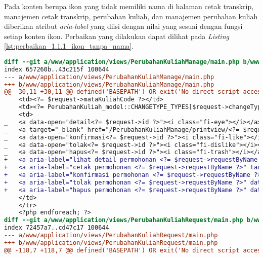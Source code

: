 Pada konten berupa ikon yang tidak memiliki nama di halaman cetak transkrip, manajemen cetak transkrip, perubahan kuliah, dan manajemen perubahan kuliah diberikan atribut \textit{aria-label} yang diisi dengan nilai yang sesuai dengan fungsi setiap konten ikon. Perbaikan yang dilakukan dapat dilihat pada \textit{Listing} \ref{lst:perbaikan_1.1.1_ikon_tanpa_nama}.
\begin{lstlisting}[frame=single, label={lst:perbaikan_1.1.1_ikon_tanpa_nama}, language=diff, caption=Perbaikan Kriteria Sukses 1.1.1]
diff --git a/www/application/views/PerubahanKuliahManage/main.php b/www/application/views/PerubahanKuliahManage/main.php
index 657260b..43c215f 100644
--- a/www/application/views/PerubahanKuliahManage/main.php
+++ b/www/application/views/PerubahanKuliahManage/main.php
@@ -30,11 +30,11 @@ defined('BASEPATH') OR exit('No direct script access allowed');
    <td><?= $request->mataKuliahCode ?></td>
    <td><?= PerubahanKuliah_model::CHANGETYPE_TYPES[$request->changeType] ?></td>
    <td>
_   <a data-open="detail<?= $request->id ?>"><i class="fi-eye"></i></a>
_   <a target="_blank" href="/PerubahanKuliahManage/printview/<?= $request->id ?>"><i class="fi-print"></i></a>
_   <a data-open="konfirmasi<?= $request->id ?>"><i class="fi-like"></i></a>                                    
_   <a data-open="tolak<?= $request->id ?>"><i class="fi-dislike"></i></a>
_   <a data-open="hapus<?= $request->id ?>"><i class="fi-trash"></i></a>
+   <a aria-label="lihat detail permohonan <?= $request->requestByName ?>" data-open="detail<?= $request->id ?>"><i class="fi-eye"></i></a>
+   <a aria-label="cetak permohonan <?= $request->requestByName ?>" target="_blank" href="/PerubahanKuliahManage/printview/<?= $request->id ?>"><i class="fi-print"></i></a>
+   <a aria-label="konfirmasi permohonan <?= $request->requestByName ?>" data-open="konfirmasi<?= $request->id ?>"><i class="fi-like"></i></a>
+   <a aria-label="tolak permohonan <?= $request->requestByName ?>" data-open="tolak<?= $request->id ?>"><i class="fi-dislike"></i></a>
+   <a aria-label="hapus permohonan <?= $request->requestByName ?>" data-open="hapus<?= $request->id ?>"><i class="fi-trash"></i></a>
    </td>
    </tr>
    <?php endforeach; ?>
diff --git a/www/application/views/PerubahanKuliahRequest/main.php b/www/application/views/PerubahanKuliahRequest/main.php
index 72457a7..cd47c17 100644
--- a/www/application/views/PerubahanKuliahRequest/main.php
+++ b/www/application/views/PerubahanKuliahRequest/main.php
@@ -118,7 +118,7 @@ defined('BASEPATH') OR exit('No direct script access allowed');

\end{lstlisting}
